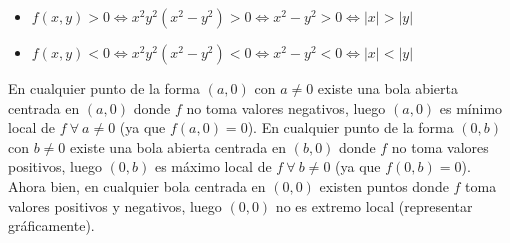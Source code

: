 \documentclass[12pt]{report}
\begin{document}
\begin{itemize}
    \item $f(x,y) > 0 \iff x^2y^2(x^2-y^2) > 0 \iff x^2-y^2> 0 \iff |x| > |y|$
    \item $f(x,y) < 0 \iff x^2y^2(x^2-y^2) < 0 \iff x^2-y^2< 0 \iff |x| < |y|$
\end{itemize}
En cualquier punto de la forma $(a,0)$ con $a \neq 0$ existe una bola abierta centrada en $(a,0)$ donde $f$ no toma valores negativos, luego $(a,0)$ es mínimo local de $f \ \forall \ a \neq 0$ (ya que $f(a,0) = 0$). En cualquier punto de la forma $(0,b)$ con $b \neq 0$ existe una bola abierta centrada en $(b,0)$ donde $f$ no toma valores positivos, luego $(0,b)$ es máximo local de $f \ \forall \ b \neq 0$ (ya que $f(0,b) = 0$). Ahora bien, en cualquier bola centrada en $(0,0)$ existen puntos donde $f$ toma valores positivos y negativos, luego $(0,0)$ no es extremo local (representar gráficamente).
\end{document}
